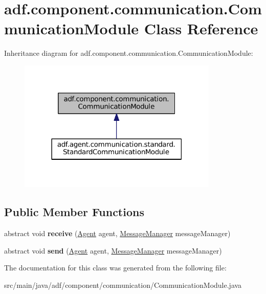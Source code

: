\hypertarget{classadf_1_1component_1_1communication_1_1CommunicationModule}{}\section{adf.\+component.\+communication.\+Communication\+Module Class Reference}
\label{classadf_1_1component_1_1communication_1_1CommunicationModule}


Inheritance diagram for adf.\+component.\+communication.\+Communication\+Module\+:
\nopagebreak
\begin{figure}[H]
\begin{center}
\leavevmode
\includegraphics[width=270pt]{classadf_1_1component_1_1communication_1_1CommunicationModule__inherit__graph}
\end{center}
\end{figure}
\subsection*{Public Member Functions}
\begin{DoxyCompactItemize}
\item 
\hypertarget{classadf_1_1component_1_1communication_1_1CommunicationModule_a952c4d7e78483b49e4ad5b39f7a1c4c9}{}\label{classadf_1_1component_1_1communication_1_1CommunicationModule_a952c4d7e78483b49e4ad5b39f7a1c4c9} 
abstract void {\bfseries receive} (\hyperlink{classadf_1_1agent_1_1Agent}{Agent} agent, \hyperlink{classadf_1_1agent_1_1communication_1_1MessageManager}{Message\+Manager} message\+Manager)
\item 
\hypertarget{classadf_1_1component_1_1communication_1_1CommunicationModule_a1112befc9a69844215147728d08de734}{}\label{classadf_1_1component_1_1communication_1_1CommunicationModule_a1112befc9a69844215147728d08de734} 
abstract void {\bfseries send} (\hyperlink{classadf_1_1agent_1_1Agent}{Agent} agent, \hyperlink{classadf_1_1agent_1_1communication_1_1MessageManager}{Message\+Manager} message\+Manager)
\end{DoxyCompactItemize}


The documentation for this class was generated from the following file\+:\begin{DoxyCompactItemize}
\item 
src/main/java/adf/component/communication/Communication\+Module.\+java\end{DoxyCompactItemize}
